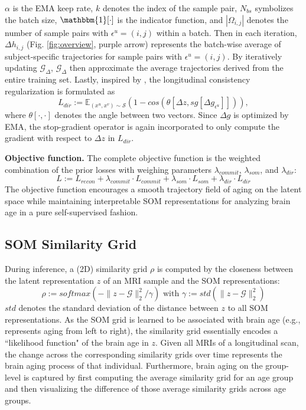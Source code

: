 \documentclass[runningheads]{llncs}
\begin{document}
$\alpha$ is the EMA keep rate, $k$ denotes the index of the sample pair, $N_{bs}$ symbolizes the batch size,  $\mathbbm{1}[\cdot]$ is the indicator function, and  $|\Omega_{i,j}|$ denotes the number of sample pairs with $\epsilon^u=(i,j)$ within a batch. Then in each iteration, $\Delta h_{i,j}$ (Fig. \ref{fig:overview}, purple arrow) represents the batch-wise average of subject-specific trajectories for sample pairs with $\epsilon^u = (i,j)$. By iteratively updating $\mathcal{G}_{\Delta}$, $\mathcal{G}_{\Delta}$ then approximate the average
 trajectories derived from the entire training set. Lastly, inspired by \cite{ouyang2021self,ouyang2022self}, the longitudinal consistency regularization is formulated as
\begin{equation*}
\label{eqn:dir}
L_{dir} := \mathbb{E}_{(x^u, x^v) \sim \mathcal{S}} \left( 1 - cos(\theta [\Delta z, sg[\Delta g_{\epsilon^u}]])\right),
\end{equation*}
where $\theta [\cdot, \cdot]$ denotes the angle between two vectors. Since $\Delta g$ is optimized by EMA, the stop-gradient operator is again incorporated to only compute the gradient with respect to $\Delta z$ in $L_{dir}$. 

\noindent\textbf{Objective function.} The complete objective function is the weighted combination of the prior losses with weighing parameters $\lambda_{commit}$, $\lambda_{som}$, and $\lambda_{dir}$:
\begin{equation*}
\label{eqn:final}
L := L_{recon} + \lambda_{commit} \cdot L_{commit} + \lambda_{som} \cdot L_{som} + \lambda_{dir} \cdot L_{dir}
\end{equation*}
The objective function encourages a smooth trajectory field of aging on the latent space while maintaining interpretable SOM representations for analyzing brain age in a pure self-supervised fashion.

\subsection{SOM Similarity Grid} 
During inference, a (2D) similarity grid $\rho$ is computed by the closeness between the latent representation $z$ of an MRI sample and the SOM representations:
\begin{equation*}
\label{eqn:sim}
\rho := softmax(-\parallel z - \mathcal{G} \parallel_2^2 / \gamma) \mbox{ with } \gamma := std(\parallel z - \mathcal{G} \parallel_2^2)
\end{equation*}
$std$ denotes the standard deviation of the distance between $z$ to all SOM representations. As the SOM grid is learned to be associated with brain age (e.g., represents aging from left to right), 
the similarity grid essentially encodes a ``likelihood function" of the brain age in $z$. Given all MRIs of a longitudinal scan, the change across the corresponding similarity grids over time represents the brain aging process of that individual. Furthermore, brain aging on the group-level is captured by first computing the average similarity grid for an age group and then visualizing the difference of those average similarity grids across age groups.
\end{document}
